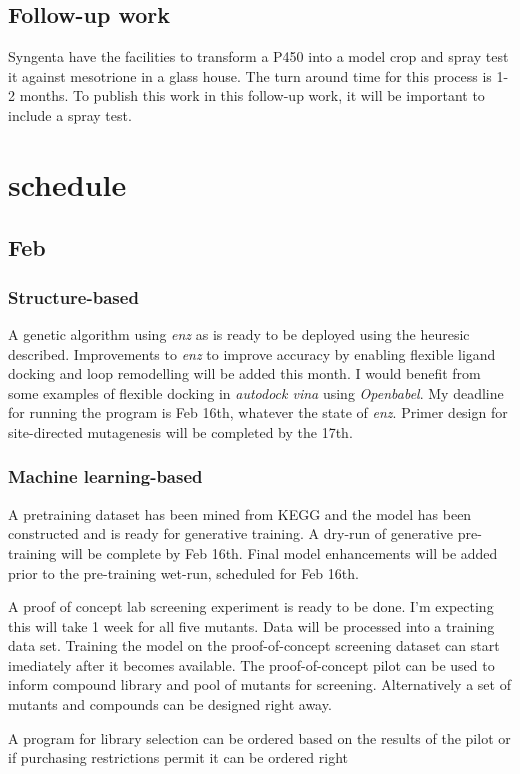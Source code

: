 \documentclass{article}
\begin{document}
\subsection{Follow-up work}
Syngenta have the facilities to transform a P450 into a model crop and spray test it against mesotrione in a glass house. The turn around time for this process is 1-2 months. To publish this work in this follow-up work, it will be important to include a spray test. %

\section{schedule}

\subsection{Feb}
\subsubsection{Structure-based}
A genetic algorithm using \textit{enz} as is ready to be deployed using the heuresic described. %
Improvements to \textit{enz} to improve accuracy by enabling flexible ligand docking and loop remodelling will be added this month. I would benefit from some examples of flexible docking in \textit{autodock vina} using \textit{Openbabel}. %
My deadline for running the program is Feb 16th, whatever the state of \textit{enz}.
Primer design for site-directed mutagenesis will be completed by the 17th. %

\subsubsection{Machine learning-based}
A pretraining dataset has been mined from KEGG and the model has been constructed and is ready for generative training. %
A dry-run of generative pre-training will be complete by Feb 16th. %
Final model enhancements will be added prior to the pre-training wet-run, scheduled for Feb 16th. %
\par
A proof of concept lab screening experiment is ready to be done. I'm expecting this will take 1 week for all five mutants. Data will be processed into a training data set. %
Training the model on the proof-of-concept screening dataset can start imediately after it becomes available.  %
The proof-of-concept pilot can be used to inform compound library and pool of mutants for screening. Alternatively a set of mutants and compounds can be designed right away. %
\par
A program for library selection can be ordered based on the results of the pilot or if purchasing restrictions permit it can be ordered right %
\end{document}
